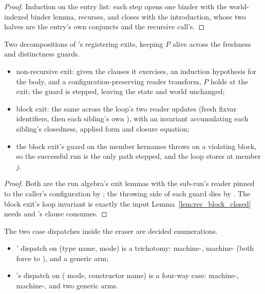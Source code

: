 \begin{proof}
\leanok
{}
 Induction on the entry list: each step opens one binder with the world-indexed binder
lemma, recurses, and closes with the  introduction, whose two halves are the entry's own
conjuncts and the recursive call's.
\end{proof}
\begin{lemma}
\label{lem:run_nonrec_exit_okW}
\leanok
{}
 Two decompositions of 's registering exits, keeping $P$ alive across
the freshness and distinctness guards.
\begin{itemize}
\item non-recursive exit: given the  clauses it exercises, an induction hypothesis for
the body, and a configuration-preserving reader transform, $P$ holds at the exit; the
 guard is stepped, leaving the state and world unchanged;
\item block exit: the same across the loop's two reader updates (fresh fixvar identifiers, then each
sibling's own ), with an invariant accumulating each sibling's closedness, applied
form and closure equation;
\item the block exit's  guard on the member kernames throws on a violating block, so the
successful run is the only path stepped, and the loop stores  at
member $j$.
\end{itemize}
\end{lemma}
\begin{proof}
\leanok
{}
 Both are the run algebra's exit lemmas with the sub-run's reader pinned to the caller's
configuration by ; the throwing side of each guard dies by .
The block exit's loop invariant is exactly the input Lemma~\ref{lem:rec_block_closed} needs and
's  clause consumes.
\end{proof}
\begin{lemma}
\label{lem:visitCases_match_tri}
\leanok
{}
 The two case dispatches inside the eraser are decided enumerations.
\begin{itemize}
\item {}' dispatch on (type name,  mode) is a trichotomy: machine-,
machine- (both force  to ), and a generic arm;
\item {}'s dispatch on ( mode, constructor name) is a four-way case:
machine-, machine-, and two generic arms.
\end{itemize}
\end{lemma}
